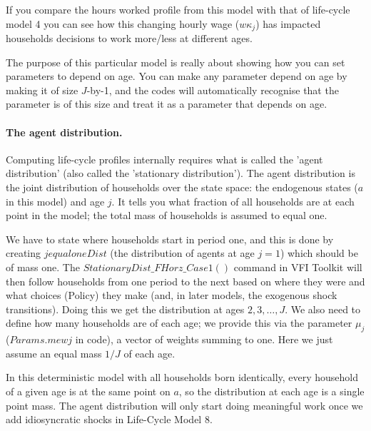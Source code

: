 If you compare the hours worked profile from this model with that of life-cycle model 4 you can see how this changing hourly wage ($w \kappa_j$) has impacted households decisions to work more/less at different ages.

The purpose of this particular model is really about showing how you can set parameters to depend on age. You can make any parameter depend on age by making it of size $J$-by-1, and the codes will automatically recognise that the parameter is of this size and treat it as a parameter that depends on age.

\paragraph{The agent distribution.}
Computing life-cycle profiles internally requires what is called the 'agent distribution' (also called the 'stationary distribution'). The agent distribution is the joint distribution of households over the state space: the endogenous states ($a$ in this model) and age $j$. It tells you what fraction of all households are at each point in the model; the total mass of households is assumed to equal one.

We have to state where households start in period one, and this is done by creating $jequaloneDist$ (the distribution of agents at age $j=1$) which should be of mass one. The $StationaryDist\_{}FHorz\_{}Case1()$ command in VFI Toolkit will then follow households from one period to the next based on where they were and what choices (Policy) they make (and, in later models, the exogenous shock transitions). Doing this we get the distribution at ages $2, 3, \ldots, J$. We also need to define how many households are of each age; we provide this via the parameter $\mu_j$ ($Params.mewj$ in code), a vector of weights summing to one. Here we just assume an equal mass $1/J$ of each age.

In this deterministic model with all households born identically, every household of a given age is at the same point on $a$, so the distribution at each age is a single point mass. The agent distribution will only start doing meaningful work once we add idiosyncratic shocks in Life-Cycle Model 8.
